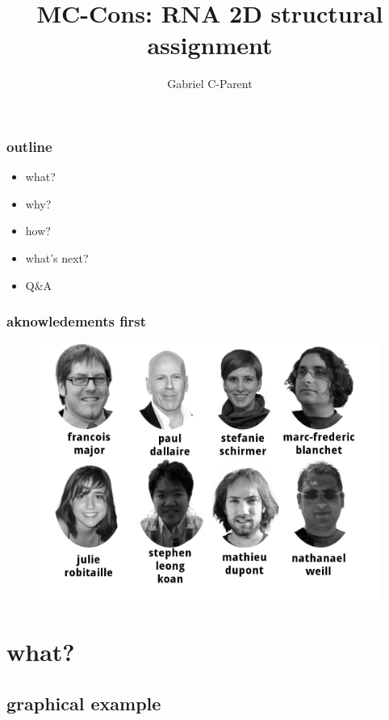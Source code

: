 \documentclass{beamer}
\title{MC-Cons: RNA 2D structural assignment}
\author{Gabriel C-Parent}
\begin{document}
\maketitle


\begin{frame}
	\frametitle{outline}
	\begin{center}
		\begin{itemize}
			\item what?
			\item why?
			\item how?
			\item what's next?
			\item Q\&A
		\end{itemize}
	\end{center}
\end{frame}


\begin{frame}
	\frametitle{aknowledements first}
	\begin{figure}[!htb]
	\centering
	\includegraphics[scale=0.25]{lab.jpg}
	\end{figure}
\end{frame}

\section{what?}

\subsection{graphical example}
\end{document}

